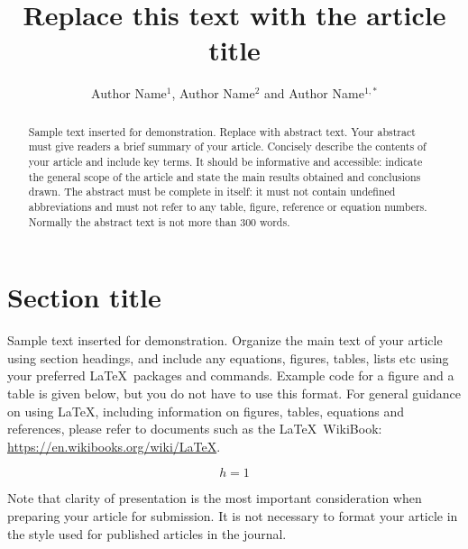 \documentclass{iopjournal}
\begin{document}

\title{Replace this text with the article title}

\author{Author Name$^1$, Author Name$^2$ and Author Name$^{1,*}$}






\begin{abstract}
Sample text inserted for demonstration. Replace with abstract text. Your abstract must give readers a brief summary of your article. Concisely describe the contents of your article and include key terms. It should be informative and accessible: indicate the general scope of the article and state the main results obtained and conclusions drawn. The abstract must be complete in itself: it must not contain undefined abbreviations and must not refer to any table, figure, reference or equation numbers. Normally the abstract text is not more than 300 words.
\end{abstract}

\section{Section title}
Sample text inserted for demonstration. Organize the main text of your article using section headings, and include any equations, figures, tables, lists etc using your preferred \LaTeX\ packages and commands. Example code for a figure and a table is given below, but you do not have to use this format. For general guidance on using \LaTeX , including information on figures, tables, equations and references, please refer to documents such as the \LaTeX\ WikiBook: \href{https://en.wikibooks.org/wiki/LaTeX}{https://en.wikibooks.org/wiki/LaTeX}.

\begin{equation}
h=1
\end{equation}

Note that clarity of presentation is the most important consideration when preparing your article for submission. It is not necessary to format your article in the style used for published articles in the journal.
\end{document}
